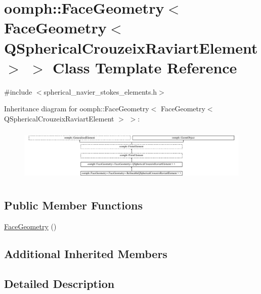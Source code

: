 \hypertarget{classoomph_1_1FaceGeometry_3_01FaceGeometry_3_01QSphericalCrouzeixRaviartElement_01_4_01_4}{}\section{oomph\+:\+:Face\+Geometry$<$ Face\+Geometry$<$ Q\+Spherical\+Crouzeix\+Raviart\+Element $>$ $>$ Class Template Reference}
\label{classoomph_1_1FaceGeometry_3_01FaceGeometry_3_01QSphericalCrouzeixRaviartElement_01_4_01_4}


{\ttfamily \#include $<$spherical\+\_\+navier\+\_\+stokes\+\_\+elements.\+h$>$}

Inheritance diagram for oomph\+:\+:Face\+Geometry$<$ Face\+Geometry$<$ Q\+Spherical\+Crouzeix\+Raviart\+Element $>$ $>$\+:\begin{figure}[H]
\begin{center}
\leavevmode
\includegraphics[height=2.616822cm]{classoomph_1_1FaceGeometry_3_01FaceGeometry_3_01QSphericalCrouzeixRaviartElement_01_4_01_4}
\end{center}
\end{figure}
\subsection*{Public Member Functions}
\begin{DoxyCompactItemize}
\item 
\hyperlink{classoomph_1_1FaceGeometry_3_01FaceGeometry_3_01QSphericalCrouzeixRaviartElement_01_4_01_4_a034502b9ee6215cd15ff6435c05607e4}{Face\+Geometry} ()
\end{DoxyCompactItemize}
\subsection*{Additional Inherited Members}


\subsection{Detailed Description}
